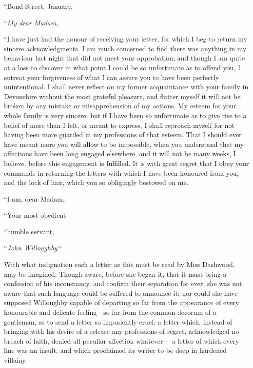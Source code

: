 \documentclass{article}
\begin{document}
\bigskip
                              ``Bond Street, January.
\medskip

     ``\emph{My dear Madam},
\medskip

     ``I have just had the honour of receiving your
     letter, for which I beg to return my sincere
     acknowledgments.  I am much concerned to find there
     was anything in my behaviour last night that did
     not meet your approbation; and though I am quite at
     a loss to discover in what point I could be so
     unfortunate as to offend you, I entreat your
     forgiveness of what I can assure you to have been
     perfectly unintentional.  I shall never reflect on
     my former acquaintance with your family in Devonshire
     without the most grateful pleasure, and flatter
     myself it will not be broken by any mistake or
     misapprehension of my actions.  My esteem for your
     whole family is very sincere; but if I have been so
     unfortunate as to give rise to a belief of more than
     I felt, or meant to express, I shall reproach myself
     for not having been more guarded in my professions
     of that esteem.  That I should ever have meant more
     you will allow to be impossible, when you understand
     that my affections have been long engaged elsewhere,
     and it will not be many weeks, I believe, before
     this engagement is fulfilled.  It is with great
     regret that I obey your commands in returning the
     letters with which I have been honoured from you,
     and the lock of hair, which you so obligingly bestowed
     on me.

     ``I am, dear Madam,

               ``Your most obedient

                    ``humble servant,

\medskip
                                        ``\emph{John Willoughby}.``
\bigskip

With what indignation such a letter as this must
be read by Miss Dashwood, may be imagined.  Though aware,
before she began it, that it must bring a confession
of his inconstancy, and confirm their separation for ever,
she was not aware that such language could be suffered
to announce it; nor could she have supposed Willoughby
capable of departing so far from the appearance of every
honourable and delicate feeling---so far from the common
decorum of a gentleman, as to send a letter so impudently
cruel: a letter which, instead of bringing with his desire
of a release any professions of regret, acknowledged no
breach of faith, denied all peculiar affection whatever---%
a letter of which every line was an insult, and which
proclaimed its writer to be deep in hardened villainy.
\end{document}
